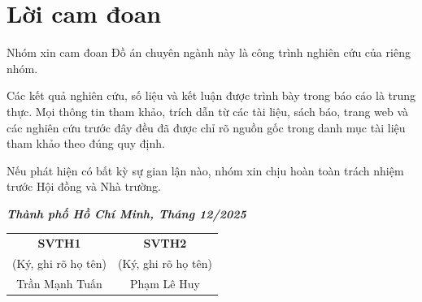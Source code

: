 \chapter*{Lời cam đoan}

Nhóm xin cam đoan Đồ án chuyên ngành này là công trình nghiên cứu của riêng nhóm.

Các kết quả nghiên cứu, số liệu và kết luận được trình bày trong báo cáo là trung thực. Mọi thông tin tham khảo, trích dẫn từ các tài liệu, sách báo, trang web và các nghiên cứu trước đây đều đã được chỉ rõ nguồn gốc trong danh mục tài liệu tham khảo theo đúng quy định.

Nếu phát hiện có bất kỳ sự gian lận nào, nhóm xin chịu hoàn toàn trách nhiệm trước Hội đồng và Nhà trường.

\vspace{2cm}

\noindent
\textbf{\textit{Thành phố Hồ Chí Minh, Tháng 12/2025}}

\vspace{1.5cm}

\begin{center}
  \begin{tabular}{p{} p{}}
  \multicolumn{1}{c}{\textbf{SVTH1}} &
  \multicolumn{1}{c}{\textbf{SVTH2}} \\

  \multicolumn{1}{c}{(Ký, ghi rõ họ tên)} &
  \multicolumn{1}{c}{(Ký, ghi rõ họ tên)} \\[3cm]

  \multicolumn{1}{c}{Trần Mạnh Tuấn} &
  \multicolumn{1}{c}{Phạm Lê Huy}
  \end{tabular}
\end{center}
